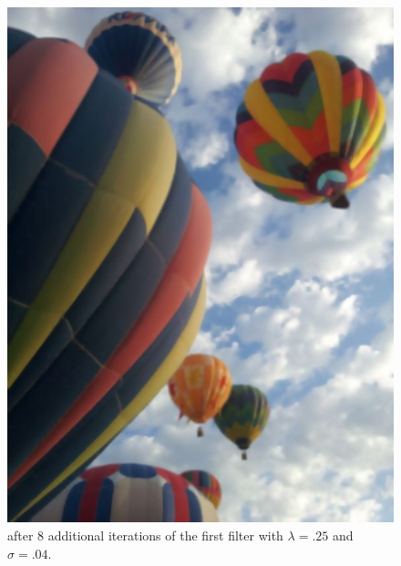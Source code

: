 \begin{figure}[ht]
\begin{minipage}[b]{0.45\linewidth}
\includegraphics[width=\textwidth]{baloons_resized_both.jpg}
\caption*{after 8 additional iterations of the first filter with $\lambda=.25$ and $\sigma=.04$.}
\end{minipage}
\end{figure}
\vfill
\clearpage

\nocite{Perona1988,Kim2009}



